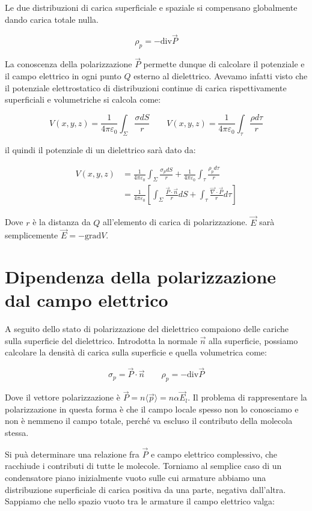 Le due distribuzioni di carica superficiale e spaziale si compensano globalmente dando carica totale nulla.

\[
	\boxed{\rho_p = - \text{div}\vec{P}}
\]

La conoscenza della polarizzazione $\vec{P}$ permette dunque di calcolare il potenziale e il campo elettrico in ogni punto $Q$ esterno al dielettrico. Avevamo infatti visto che il potenziale elettrostatico di distribuzioni continue di carica rispettivamente superficiali e volumetriche si calcola come:

\[
	V(x,y,z) = \frac{1}{4\pi \varepsilon_0}\int_{\Sigma}\frac{\sigma dS}{r} \qquad V(x,y,z) = \frac{1}{4\pi \varepsilon_0} \int_{\tau} \frac{\rho d\tau}{r}
\]

il quindi il potenziale di un dielettrico sarà dato da:

\begin{align*}
	V(x,y,z) &= \frac{1}{4\pi \varepsilon_0}\int_{\Sigma}\frac{\sigma_p  dS}{r} + \frac{1}{4\pi \varepsilon_0} \int_{\tau} \frac{\rho_p  d\tau}{r} \\
	&= \frac{1}{4\pi \varepsilon_0} \left[ \int_{\Sigma}\frac{\vec{P} \cdot \vec{n}}{r}dS + \int_{\tau}\frac{\vec{\nabla} \cdot \vec{P}}{r} d\tau  \right]
\end{align*}

Dove $r$ è la distanza da $Q$ all'elemento di carica di polarizzazione. $\vec{E}$ sarà semplicemente $ \vec{E} = - \text{grad}V $.

\section{Dipendenza della polarizzazione dal campo elettrico}

A seguito dello stato di polarizzazione del dielettrico compaiono delle cariche sulla superficie del dielettrico. Introdotta la normale $\vec{n}$ alla superficie, possiamo calcolare la densità di carica sulla superficie e quella volumetrica come:

\[
	\sigma_p = \vec{P} \cdot \vec{n}  \qquad \rho_p=-\text{div}\vec{P}
\]

Dove il vettore polarizzazione è $\vec{P} = n \langle \vec{p} \rangle = n\alpha \vec{E}_l$.
Il problema di rappresentare la polarizzazione in questa forma è che il campo locale spesso non lo conosciamo e non è nemmeno il campo totale, perché va escluso il contributo della molecola stessa.

Si puà determinare una relazione fra $\vec{P}$ e campo elettrico complessivo, che racchiude i contributi di tutte le molecole. Torniamo al semplice caso di un condensatore piano inizialmente vuoto sulle cui armature abbiamo una distribuzione superficiale di carica positiva da una parte, negativa dall'altra. Sappiamo che nello spazio vuoto tra le armature il campo elettrico valga:


